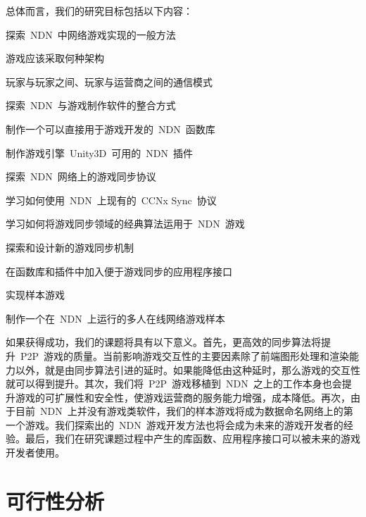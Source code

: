 总体而言，我们的研究目标包括以下内容：
\begin{itemize*}
\item 探索~NDN~中网络游戏实现的一般方法
  \begin{itemize*}
  \item 游戏应该采取何种架构
  \item 玩家与玩家之间、玩家与运营商之间的通信模式
  \end{itemize*}
\item 探索~NDN~与游戏制作软件的整合方式
  \begin{itemize*}
  \item 制作一个可以直接用于游戏开发的~NDN~函数库
  \item 制作游戏引擎~Unity3D\tm~可用的~NDN~插件
  \end{itemize*}
\item 探索~NDN~网络上的游戏同步协议
  \begin{itemize*}
  \item 学习如何使用~NDN~上现有的~CCNx Sync~协议\cite{CCNxSync}
  \item 学习如何将游戏同步领域的经典算法运用于~NDN~游戏
  \item 探索和设计新的游戏同步机制
  \item 在函数库和插件中加入便于游戏同步的应用程序接口
  \end{itemize*}
\item 实现样本游戏
  \begin{itemize*}
  \item 制作一个在~NDN~上运行的多人在线网络游戏样本
  \end{itemize*}
\end{itemize*}

如果获得成功，我们的课题将具有以下意义。首先，更高效的同步算法将提升~P2P~游戏的质量。当前影响游戏交互性的主要因素除了前端图形处理和渲染能力以外，就是由同步算法引进的延时。如果能降低由这种延时，那么游戏的交互性就可以得到提升。其次，我们将~P2P~游戏移植到~NDN~之上的工作本身也会提升游戏的可扩展性和安全性，使游戏运营商的服务能力增强，成本降低。再次，由于目前~NDN~上并没有游戏类软件，我们的样本游戏将成为数据命名网络上的第一个游戏。我们探索出的~NDN~游戏开发方法也将会成为未来的游戏开发者的经验。最后，我们在研究课题过程中产生的库函数、应用程序接口可以被未来的游戏开发者使用。

\section{可行性分析}

